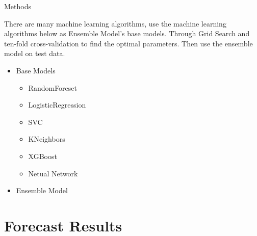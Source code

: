 \documentclass[
 size=14pt,
 paper=smartboard,  %
 mode=present, 		%
 display=slides, 	%
 style=tuliplab,  	%
 pauseslide,
 fleqn,leqno]{powerdot}
\begin{document}
\begin{slide}[toc=,bm=]{Methods}

There are many machine learning algorithms, 
use the machine learning algorithms below
as Ensemble Model’s base models. 
Through Grid Search and
ten-fold cross-validation
to find the optimal parameters.
Then use the ensemble model on
test data.

\begin{center}
	\begin{itemize}
		\item Base Models
		\
		\begin{itemize}
			\item RandomForeset
			\item LogisticRegression
			\item SVC
			\item KNeighbors
			\item XGBoost
			\item Netual Network
		\end{itemize}
	    \item Ensemble Model
	\end{itemize}
\end{center}

\end{slide}


\section{Forecast Results}
\end{document}
